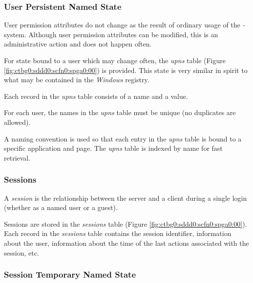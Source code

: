 \subsubsection{User Persistent Named State}
\label{ctbg0:sddd0:scfn0:supn0}

User permission attributes do not change as the result of ordinary usage of
the \emph{\productbasename{}-\productversion{}} system.  Although 
user permission attributes can be modified, this is an administrative action
and does not happen often.

For state bound to a user which may change often, the 
\emph{upns} table (Figure \ref{fig:ctbg0:sddd0:scfn0:spga0:00}) is
provided.  This state is very similar in spirit to what may be contained
in the \emph{Windows} registry.

Each record in the \emph{upns} table consists of a name and a value.

For each user, the names in the \emph{upns} table must be unique (no
duplicates are allowed).

A naming convention is used so that each entry in the \emph{upns} table
is bound to a specific application and page.  The \emph{upns} table is indexed
by name for fast retrieval.


\subsubsection{Sessions}
\label{ctbg0:sddd0:scfn0:sses0}

A \emph{session} is the relationship between the server and a client during
a single login (whether as a named user or a guest).

Sessions are stored in the \emph{sessions} table 
(Figure \ref{fig:ctbg0:sddd0:scfn0:spga0:00}).  Each record in the 
\emph{sessions} table contains the session identifier, information about the
user, information about the time of the last actions associated with the
session, etc.


\subsubsection{Session Temporary Named State}
\label{ctbg0:sddd0:scfn0:sstn0}


